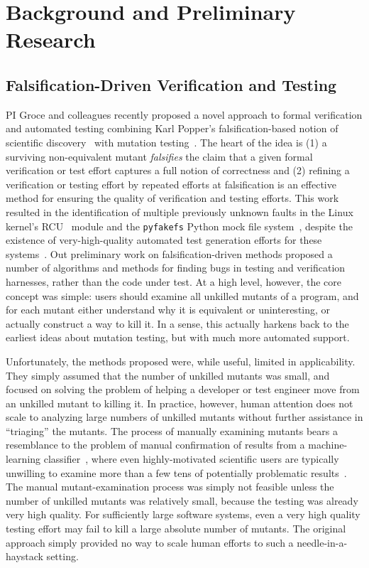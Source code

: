 \section{Background and Preliminary Research}

\subsection{Falsification-Driven Verification and Testing}

PI Groce and colleagues recently proposed a novel approach to
formal verification and automated testing 
combining Karl Popper's falsification-based notion of
scientific discovery~\cite{Popper,popperconjectures} with mutation
testing~\cite{groce2015verified,groce2018verified,mutKernel}.
The heart of the idea is (1) a surviving non-equivalent mutant 
\emph{falsifies} the claim that a given
formal verification or test effort captures a full notion of
correctness and (2) refining a
verification or testing effort by repeated efforts at falsification is an
effective method for ensuring the quality of verification and testing
efforts.  This
work resulted in the identification of multiple previously unknown faults in
the Linux kernel's
RCU~\cite{MathieuDesnoyers2012URCU,DinakarGuniguntala2008IBMSysJ,McKenney:2013:SDS:2483852.2483867}
module and the {\tt pyfakefs} Python mock file
system~\cite{pyfakefs}, despite the existence of very-high-quality
automated test generation efforts for these
systems~\cite{rcutorture,TSTL}.  Out preliminary work on
falsification-driven methods proposed a number of algorithms and
methods for finding bugs in testing and verification
harnesses, rather than the code under test.  At a high level, however,
the core concept was simple:  users should examine all unkilled
mutants of a program, and for each mutant either understand why it is
equivalent or uninteresting, or actually construct a way to kill it.  In a sense, this actually harkens back to the
earliest ideas about mutation testing, but with 
much more automated support. 

Unfortunately, the
methods proposed were, while useful, limited in applicability.  They simply assumed that the number of unkilled mutants was
small, and focused on solving the problem of helping a developer or
test engineer move from an unkilled mutant to killing it.
In practice, however, human
attention does not scale to analyzing large numbers of 
unkilled mutants without further assistance in ``triaging'' the mutants.  The process of manually examining mutants bears a
resemblance to the problem of manual confirmation of results from a
machine-learning classifier~\cite{OnlyOracle,EndUserMistake}, where even highly-motivated scientific
users are typically unwilling to examine more than a few tens of
potentially problematic results~\cite{Segal}.
The manual mutant-examination process was simply not feasible unless the number of
unkilled mutants was relatively small, because the testing was already
very high quality.  For sufficiently large software systems, even a
very high quality testing effort may fail to kill a
large absolute number of mutants.  The original approach simply provided no way to
scale human efforts to such a needle-in-a-haystack setting. 

